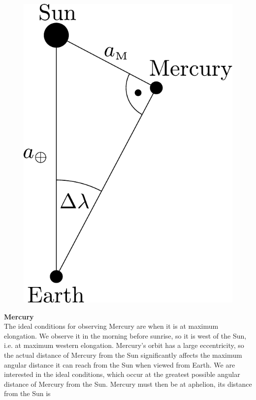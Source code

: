 \documentclass[a4paper,12pt]{extarticle}
\begin{document}
\begin{sol}	
	\begin{figure}
		\centering
		\includegraphics[width=\linewidth]{mercury_pos.pdf}
		\caption{}
		\label{mercury_tri}
	\end{figure}
	
	\textbf{Mercury}\\
	

	The ideal conditions for observing Mercury are when it is at maximum elongation. We observe it in the morning before sunrise, so it is west of the Sun, i.e. at maximum western elongation. Mercury's orbit has a large eccentricity, so the actual distance of Mercury from the Sun significantly affects the maximum angular distance it can reach from the Sun when viewed from Earth. We are interested in the ideal conditions, which occur at the greatest possible angular distance of Mercury from the Sun. Mercury must then be at aphelion, its distance from the Sun is
	

\end{sol}
\end{document}
